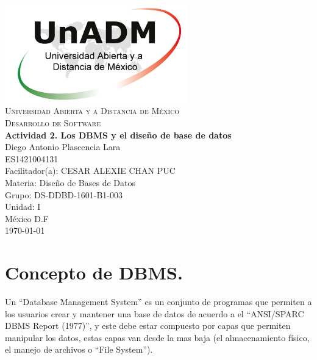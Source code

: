 \documentclass[spanish,12pt,letterpapper]{article}
\begin{document}
	\begin{titlepage}
		\begin{center}
			\includegraphics[width=0.6\textwidth]{./logoUnADM}~\\[1cm] 
			\textsc{Universidad Abierta y a Distancia de México}\\[0.8cm]
			\textsc{Desarrollo de Software}\\[1.8cm]
			
			\textbf{ \Large Actividad 2. Los DBMS y el diseño de base de datos}\\[3cm]
			
			Diego Antonio Plascencia Lara\\ ES1421004131 \\[0.4cm]
			Facilitador(a): CESAR ALEXIE CHAN PUC  \\
			Materia: Diseño de Bases de Datos\\
			Grupo: DS-DDBD-1601-B1-003 \\
			Unidad: I \\
			
			\vfill México D.F\\{\today}
			
		\end{center}
	\end{titlepage}
	
	\section{Concepto de DBMS.\\}
	Un ``Database Management System'' es un conjunto de programas que permiten a los usuarios crear y mantener una base de datos de acuerdo a el ``ANSI/SPARC DBMS Report (1977)'', y este debe estar compuesto por capas que permiten manipular los datos, estas capas van desde la mas baja (el almacenamiento físico, el manejo de archivos o ``File System'').
	
\end{document}
